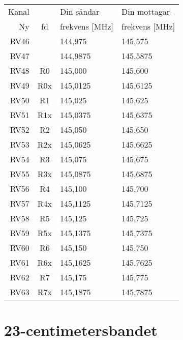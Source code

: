 \begin{tabular}{ r | c | l | l }
	Kanal & & Din sändar- & Din mottagar- \\
	Ny    & fd & frekvens [\unit{\mega\hertz}] & frekvens [\unit{\mega\hertz}] \\
	\hline
	RV46 & & 144,975 & 145,575\\
	RV47 & & 144,9875 & 145,5875\\
	RV48 & R0 & 145,000 & 145,600 \\
	RV49 & R0x & 145,0125 & 145,6125 \\
	RV50 & R1 & 145,025 & 145,625 \\
	RV51 & R1x & 145,0375 & 145,6375 \\
	RV52 & R2 & 145,050 & 145,650 \\
	RV53 & R2x & 145,0625 & 145,6625 \\
	RV54 & R3 & 145,075 & 145,675 \\
	RV55 & R3x & 145,0875 & 145,6875 \\
	RV56 & R4 & 145,100 & 145,700 \\
	RV57 & R4x & 145,1125 & 145,7125 \\
	RV58 & R5 & 145,125 & 145,725 \\
	RV59 & R5x & 145,1375 & 145,7375 \\
	RV60 & R6 & 145,150 & 145,750 \\
	RV61 & R6x & 145,1625 & 145,7625 \\
	RV62 & R7 & 145,175 & 145,775 \\
	RV63 & R7x & 145,1875 & 145,7875 \\
\end{tabular}

\section{23-centimetersbandet}

